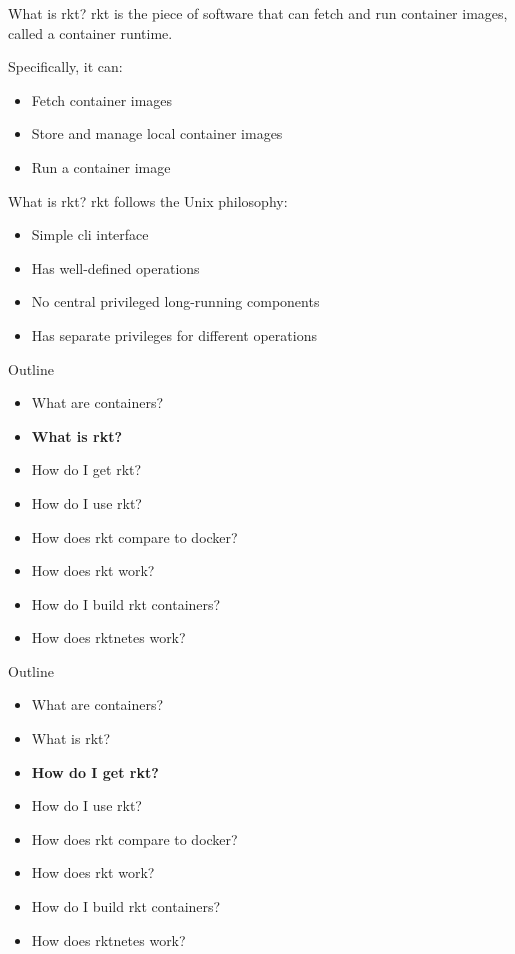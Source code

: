 \documentclass[pdf,aspectratio=169]{beamer}
\begin{document}
\begin{frame}{What is rkt?}
    rkt is the piece of software that can fetch and run container images,
    called a container runtime.

    Specifically, it can:
    \begin{itemize}
        \pause
        \item Fetch container images
        \pause
        \item Store and manage local container images
        \pause
        \item Run a container image
    \end{itemize}
\end{frame}

\begin{frame}{What is rkt?}
    rkt follows the Unix philosophy:
    \begin{itemize}
        \pause
        \item Simple cli interface
        \pause
        \item Has well-defined operations
        \pause
        \item No central privileged long-running components
        \pause
        \item Has separate privileges for different operations
    \end{itemize}
\end{frame}


\begin{frame}
    Outline
    \begin{itemize}
        \item What are containers?
        \item \textbf{What is rkt?}
        \item How do I get rkt?
        \item How do I use rkt?
        \item How does rkt compare to docker?
        \item How does rkt work?
        \item How do I build rkt containers?
        \item How does rktnetes work?
    \end{itemize}
\end{frame}

\begin{frame}
    Outline
    \begin{itemize}
        \item What are containers?
        \item What is rkt?
        \item \textbf{How do I get rkt?}
        \item How do I use rkt?
        \item How does rkt compare to docker?
        \item How does rkt work?
        \item How do I build rkt containers?
        \item How does rktnetes work?
    \end{itemize}
\end{frame}
\end{document}
